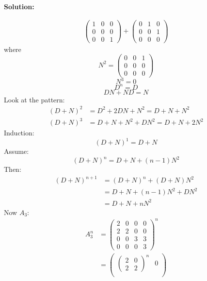 \documentclass[12pt]{article}
\newenvironment{solution}{
    \textbf{Solution:}
    
}{
    
    \vspace{2em}
}
\begin{document}
\begin{solution}
\[\begin{aligned}
\begin{pmatrix}
                1 & 0 & 0 \\
                0 & 0 & 0 \\
                0 & 0 & 1
            \end{pmatrix} + \begin{pmatrix}
                0 & 1 & 0 \\
                0 & 0 & 1 \\
                0 & 0 & 0
            \end{pmatrix}
        \end{aligned}
    \]
    where
    \[
        N^2 = \begin{pmatrix}
            0 & 0 & 1 \\
            0 & 0 & 0 \\
            0 & 0 & 0
        \end{pmatrix}
    \]
    \[
        N^3 = 0
    \]
    \[
        D^n = D
    \]
    \[
        DN + ND = N
    \]
    Look at the pattern:
    \[
        \begin{aligned}
            (D+N)^2 &= D^2 + 2DN + N^2 = D + N + N^2\\
            (D+N)^3 &= D + N + N^2 + DN^2 = D + N + 2N^2
        \end{aligned}
    \]
    Induction:
    \[
        (D+N)^1 = D + N
    \]
    Assume:
    \[
        (D+N)^n = D + N + (n-1)N^2
    \]
    Then:
    \[
        \begin{aligned}
            (D+N)^{n+1} &= (D+N)^n + (D+N)N^2\\
            &= D + N + (n-1)N^2 + DN^2\\
            &= D + N + nN^2
        \end{aligned}
    \]
    Now \(A_3\):
    \[
        \begin{aligned}
            A_3^n &= \begin{pmatrix}
                2 & 0 & 0 & 0 \\
                2 & 2 & 0 & 0 \\
                0 & 0 & 3 & 3 \\
                0 & 0 & 0 & 3
            \end{pmatrix}^n\\
            &= \begin{pmatrix}
                \begin{pmatrix}
                    2 & 0 \\
                    2 & 2
                \end{pmatrix}^n & 0 \\

\end{pmatrix}
\end{aligned}\]
\end{solution}
\end{document}
